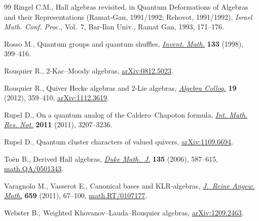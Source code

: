 \documentclass[pdftex]{sigma}
\numberwithin{equation}{section}
\begin{document}
\begin{thebibliography}{99}
Ringel C.M., Hall algebras revisited, in Quantum Deformations of Algebras and
  their Representations ({R}amat-{G}an, 1991/1992; {R}ehovot, 1991/1992),
  \textit{Israel Math. Conf. Proc.}, Vol.~7, Bar-Ilan Univ., Ramat Gan, 1993,
  171--176.

Rosso M., Quantum groups and quantum shuf\/f\/les,  \href{http://dx.doi.org/10.1007/s002220050249}{\textit{Invent. Math.}} \textbf{133}  (1998),  399--416.

Rouquier R., 2-Kac--Moody algebras, \href{http://arxiv.org/abs/0812.5023}{arXiv:0812.5023}.

Rouquier R., Quiver {H}ecke algebras and 2-{L}ie algebras, \href{http://dx.doi.org/10.1142/S1005386712000247}{\textit{Algebra
  Colloq.}} \textbf{19} (2012), 359--410, \href{http://arxiv.org/abs/1112.3619}{arXiv:1112.3619}.


Rupel D., On a quantum analog of the {C}aldero--{C}hapoton formula,
  \href{http://dx.doi.org/10.1093/imrn/rnq192}{\textit{Int. Math. Res. Not.}} \textbf{2011} (2011), 3207--3236.

Rupel D., Quantum cluster characters of valued quivers, \href{http://arxiv.org/abs/1109.6694}{arXiv:1109.6694}.

To{\"e}n B., Derived {H}all algebras, \href{http://dx.doi.org/10.1215/S0012-7094-06-13536-6}{\textit{Duke Math.~J.}} \textbf{135}
  (2006), 587--615, \href{http://arxiv.org/abs/math.QA/0501343}{math.QA/0501343}.

Varagnolo M., Vasserot E., Canonical bases and {KLR}-algebras, \href{http://dx.doi.org/10.1515/CRELLE.2011.068}{\textit{J.~Reine
  Angew. Math.}} \textbf{659} (2011), 67--100, \href{http://arxiv.org/abs/math.RT/0107177}{math.RT/0107177}.

Webster B., Weighted Khovanov--Lauda--Rouquier algebras, \href{http://arxiv.org/abs/1209.2463}{arXiv:1209.2463}.

\end{thebibliography}\LastPageEnding
\end{document}
